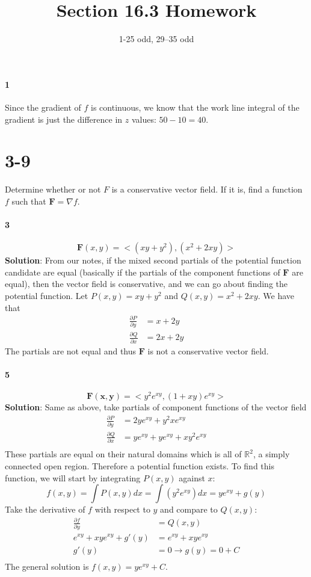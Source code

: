 \documentclass{article}
\title{Section 16.3 Homework}
\author{1-25 odd, 29--35 odd}
\date{}
\newcommand{\parf}[2]{\frac{\partial #1}{\partial #2}}
\begin{document}
    \maketitle

    \paragraph{1} Since the gradient of $f$ is continuous, we know that the work line integral of the gradient is just the difference in $z$ values: $50-10=40$.

    \section*{3-9} Determine whether or not $F$ is a conservative vector field.
    If it is, find a function $f$ such that $\mathbf{F} = \nabla f$.

    \paragraph{3}
    \[  \mathbf{F}(x,y) = <(xy+y^2), (x^2+2xy)> \]
    \textbf{Solution}: From our notes, if the mixed second partials of the potential function candidate are equal
    (basically if the partials of the component functions of $\mathbf{F}$ are equal), then the vector field is conservative, and
    we can go about finding the potential function.
    Let $P(x,y) = xy+y^2$ and $Q(x,y) = x^2+2xy$.
    We have that
    \begin{align*}
        \parf{P}{y} &= x + 2y \\
        \parf{Q}{x} &= 2x + 2y
    \end{align*}
    The partials are not equal and thus $\mathbf{F}$ is not a conservative vector field.


    \paragraph{5}
    \[\mathbf{F(x,y)}=<y^{2}e^{xy}, (1+xy)e^{xy}>\]
    \textbf{Solution}: Same as above, take partials of component functions of the vector field
    \begin{align*}
        \parf{P}{y} &= 2ye^{xy} + y^{2}xe^{xy} \\
        \parf{Q}{x} &= ye^{xy} + ye^{xy} + xy^{2}e^{xy}\\
    \end{align*}
    These partials are equal on their natural domains which is all of $\mathbb{R}^2$, a simply connected open region.
    Therefore a potential function exists.
    To find this function, we will start by integrating $P(x,y)$ against $x$:
    \[f(x,y)=\int P(x,y)dx = \int (y^{2}e^{xy}) dx = ye^{xy} + g(y)\]
    Take the derivative of $f$ with respect to $y$ and compare to $Q(x,y)$:
    \begin{align*}
        \parf{f}{y} &= Q(x,y) \\
        e^{xy} + xye^{xy} + g'(y) &= e^{xy} + xye^{xy} \\
        g'(y) &= 0 \rightarrow g(y) = 0 + C \\
    \end{align*}
    The general solution is $f(x,y) = ye^{xy} + C$.
\end{document}
